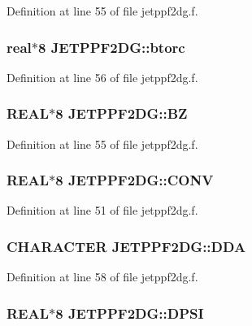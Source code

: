 Definition at line 55 of file jetppf2dg.f.\hypertarget{namespaceJETPPF2DG_b68b36ffa6613e3d1a69d435b2b5aaea}{
\subsubsection[btorc]{\setlength{\rightskip}{0pt plus 5cm}real$\ast$8 {\bf JETPPF2DG::btorc}}}
\label{namespaceJETPPF2DG_b68b36ffa6613e3d1a69d435b2b5aaea}




Definition at line 56 of file jetppf2dg.f.\hypertarget{namespaceJETPPF2DG_caf852e3dca62b109e51b850e9a30668}{
\subsubsection[BZ]{\setlength{\rightskip}{0pt plus 5cm}REAL$\ast$8 {\bf JETPPF2DG::BZ}}}
\label{namespaceJETPPF2DG_caf852e3dca62b109e51b850e9a30668}




Definition at line 55 of file jetppf2dg.f.\hypertarget{namespaceJETPPF2DG_cc9d3570fc86b09342a8977a84c9b1e6}{
\subsubsection[CONV]{\setlength{\rightskip}{0pt plus 5cm}REAL$\ast$8 {\bf JETPPF2DG::CONV}}}
\label{namespaceJETPPF2DG_cc9d3570fc86b09342a8977a84c9b1e6}




Definition at line 51 of file jetppf2dg.f.\hypertarget{namespaceJETPPF2DG_755c2f476cb350b1019df567507bd092}{
\subsubsection[DDA]{\setlength{\rightskip}{0pt plus 5cm}CHARACTER {\bf JETPPF2DG::DDA}}}
\label{namespaceJETPPF2DG_755c2f476cb350b1019df567507bd092}




Definition at line 58 of file jetppf2dg.f.\hypertarget{namespaceJETPPF2DG_fbb4fcc942fe28a23b23a8667d562b48}{
\subsubsection[DPSI]{\setlength{\rightskip}{0pt plus 5cm}REAL$\ast$8 {\bf JETPPF2DG::DPSI}}}
\label{namespaceJETPPF2DG_fbb4fcc942fe28a23b23a8667d562b48}




